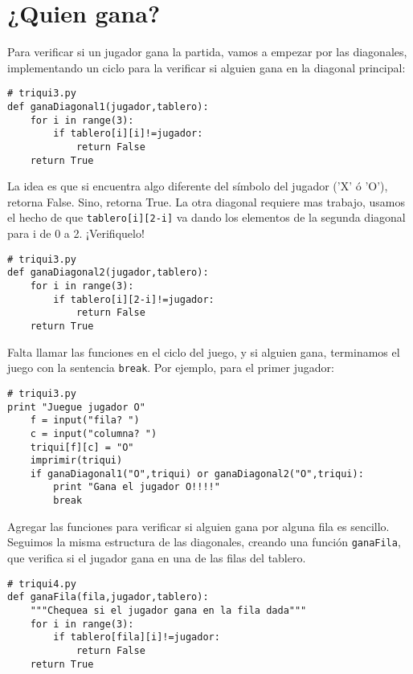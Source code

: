 \section{¿Quien gana?}

Para verificar si un jugador gana la partida, vamos a empezar por las diagonales, 
implementando un ciclo para la verificar si alguien gana en la diagonal principal:

\beforeverb
\begin{verbatim}
# triqui3.py
def ganaDiagonal1(jugador,tablero):
    for i in range(3):
        if tablero[i][i]!=jugador:
            return False
    return True
\end{verbatim}
\afterverb

La idea es que si encuentra algo diferente del símbolo del jugador ('X' ó 'O'),
retorna False. Sino, retorna True. La otra diagonal requiere mas trabajo, usamos 
el hecho de que \texttt{tablero[i][2-i]} va dando los elementos de la segunda
diagonal para i de 0 a 2. ¡Verifiquelo!

\beforeverb
\begin{verbatim}
# triqui3.py
def ganaDiagonal2(jugador,tablero):
    for i in range(3):
        if tablero[i][2-i]!=jugador:
            return False
    return True
\end{verbatim}
\afterverb

Falta llamar las funciones en el ciclo del juego, y si alguien gana, terminamos el 
juego con la sentencia \texttt{break}. Por ejemplo, para el primer jugador:

\beforeverb
\begin{verbatim}
# triqui3.py
print "Juegue jugador O"
    f = input("fila? ")
    c = input("columna? ")
    triqui[f][c] = "O"
    imprimir(triqui)
    if ganaDiagonal1("O",triqui) or ganaDiagonal2("O",triqui):
        print "Gana el jugador O!!!!"
        break
\end{verbatim}
\afterverb

Agregar las funciones para verificar si alguien gana por alguna fila es sencillo.
Seguimos la misma estructura de las diagonales, creando una función \texttt{ganaFila}, que
verifica si el jugador gana en una de las filas del tablero.

\beforeverb
\begin{verbatim}
# triqui4.py
def ganaFila(fila,jugador,tablero):
    """Chequea si el jugador gana en la fila dada"""
    for i in range(3):
        if tablero[fila][i]!=jugador:
            return False
    return True
\end{verbatim}
\afterverb

